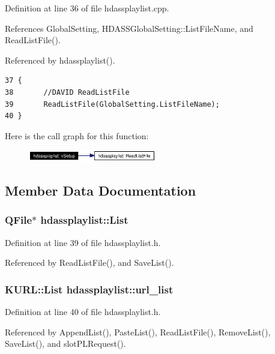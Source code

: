 Definition at line 36 of file hdassplaylist.cpp.

References Global\-Setting, HDASSGlobal\-Setting::List\-File\-Name, and Read\-List\-File().

Referenced by hdassplaylist().



\footnotesize\begin{verbatim}37 {
38       //DAVID ReadListFile
39       ReadListFile(GlobalSetting.ListFileName);
40 }
\end{verbatim}\normalsize 


Here is the call graph for this function:\begin{figure}[H]
\begin{center}
\leavevmode
\includegraphics[width=158pt]{classhdassplaylist_hdassplaylista2_cgraph}
\end{center}
\end{figure}


\subsection{Member Data Documentation}
\subsubsection{\setlength{\rightskip}{0pt plus 5cm}QFile$\ast$ {\bf hdassplaylist::List}}\label{classhdassplaylist_hdassplaylisto0}




Definition at line 39 of file hdassplaylist.h.

Referenced by Read\-List\-File(), and Save\-List().
\subsubsection{\setlength{\rightskip}{0pt plus 5cm}KURL::List {\bf hdassplaylist::url\_\-list}}\label{classhdassplaylist_hdassplaylisto1}




Definition at line 40 of file hdassplaylist.h.

Referenced by Append\-List(), Paste\-List(), Read\-List\-File(), Remove\-List(), Save\-List(), and slot\-PLRequest().
